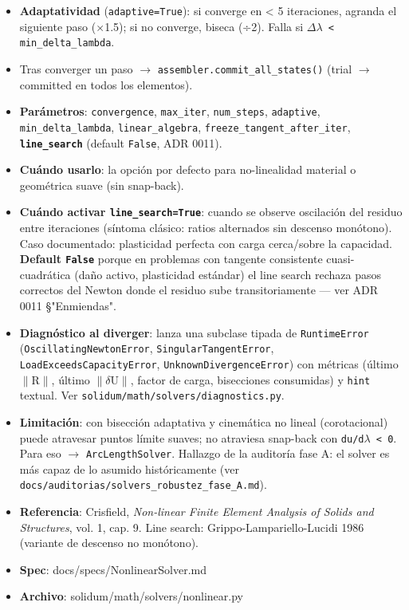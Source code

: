 \documentclass[11pt,letterpaper,oneside]{report}
\begin{document}
\begin{itemize}
  \item \textbf{Adaptatividad} (\texttt{adaptive=True}): si converge en < 5 iteraciones, agranda el siguiente paso (\ensuremath{\times}1.5); si no converge, biseca (÷2). Falla si \texttt{\ensuremath{\Delta}\ensuremath{\lambda} < min\_delta\_lambda}.
  \item Tras converger un paso \ensuremath{\to} \texttt{assembler.commit\_all\_states()} (trial \ensuremath{\to} committed en todos los elementos).
  \item \textbf{Parámetros}: \texttt{convergence}, \texttt{max\_iter}, \texttt{num\_steps}, \texttt{adaptive}, \texttt{min\_delta\_lambda}, \texttt{linear\_algebra}, \texttt{freeze\_tangent\_after\_iter}, \textbf{\texttt{line\_search}} (default \texttt{False}, ADR 0011).
  \item \textbf{Cuándo usarlo}: la opción por defecto para no-linealidad material o geométrica suave (sin snap-back).
  \item \textbf{Cuándo activar \texttt{line\_search=True}}: cuando se observe oscilación del residuo entre iteraciones (síntoma clásico: ratios alternados sin descenso monótono). Caso documentado: plasticidad perfecta con carga cerca/sobre la capacidad. \textbf{Default \texttt{False}} porque en problemas con tangente consistente cuasi-cuadrática (daño activo, plasticidad estándar) el line search rechaza pasos correctos del Newton donde el residuo sube transitoriamente --- ver ADR 0011 §"Enmiendas".
  \item \textbf{Diagnóstico al diverger}: lanza una subclase tipada de \texttt{RuntimeError} (\texttt{OscillatingNewtonError}, \texttt{SingularTangentError}, \texttt{LoadExceedsCapacityError}, \texttt{UnknownDivergenceError}) con métricas (último \ensuremath{\|}R\ensuremath{\|}, último \ensuremath{\|}\ensuremath{\delta}U\ensuremath{\|}, factor de carga, bisecciones consumidas) y \texttt{hint} textual. Ver \texttt{solidum/math/solvers/diagnostics.py}.
  \item \textbf{Limitación}: con bisección adaptativa y cinemática no lineal (corotacional) puede atravesar puntos límite suaves; no atraviesa snap-back con \texttt{du/d\ensuremath{\lambda} < 0}. Para eso \ensuremath{\to} \texttt{ArcLengthSolver}. Hallazgo de la auditoría fase A: el solver es más capaz de lo asumido históricamente (ver \texttt{docs/auditorias/solvers\_robustez\_fase\_A.md}).
  \item \textbf{Referencia}: Crisfield, \textit{Non-linear Finite Element Analysis of Solids and Structures}, vol. 1, cap. 9. Line search: Grippo-Lampariello-Lucidi 1986 (variante de descenso no monótono).
  \item \textbf{Spec}: docs/specs/NonlinearSolver.md
  \item \textbf{Archivo}: solidum/math/solvers/nonlinear.py
\end{itemize}
\end{document}
